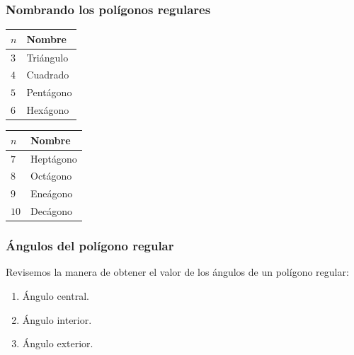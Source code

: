 \documentclass[14pt]{beamer}
\begin{document}
\begin{frame}
\frametitle{Nombrando los polígonos regulares}
\begin{minipage}{0.4\linewidth}
\begin{table}
\centering
\begin{tabular}{l | l}
$n$ & Nombre \\ \hline
$3$ & Triángulo \\ \hline \pause
$4$ & Cuadrado \\ \hline \pause
$5$ & Pentágono \\ \hline \pause
$6$ & Hexágono \\ \hline
\end{tabular}
\end{table}
\end{minipage}
\pause
\begin{minipage}{0.4\linewidth}
\begin{table}
\centering
\begin{tabular}{l | l}
$n$ & Nombre \\ \hline
$7$ & Heptágono \\ \hline \pause
$8$ & Octágono \\ \hline \pause
$9$ & Eneágono \\ \hline \pause
$10$ & Decágono \\ \hline
\end{tabular}
\end{table}
\end{minipage}
\end{frame}
\begin{frame}
\frametitle{Ángulos del polígono regular}
Revisemos la manera de obtener el valor de los ángulos de un polígono regular:
\pause
{}
\begin{enumerate}[<+->]
\item Ángulo central.
\item Ángulo interior.
\item Ángulo exterior.
\end{enumerate}
\end{frame}
\end{document}
